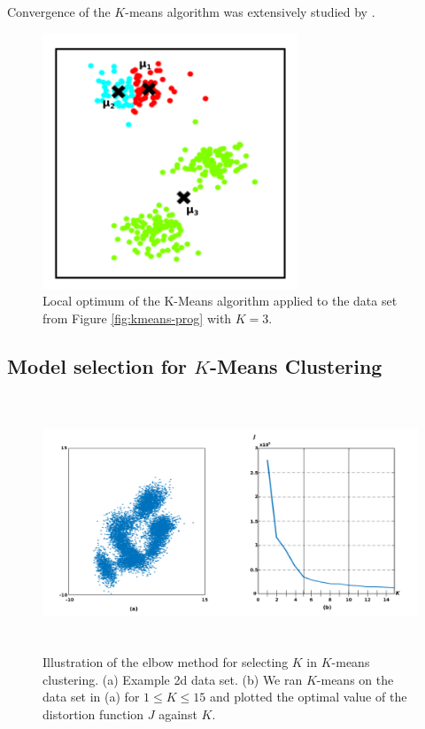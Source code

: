 \documentclass[final,3p,times,twocolumn]{elsarticle}
\begin{document}
Convergence of the $K$-means algorithm was extensively studied by \cite{macqueen1967}.

\begin{figure}
\centering
\includegraphics[width=3in]{local.png}
\caption{Local optimum of the K-Means algorithm applied to the data set from Figure \ref{fig:kmeans-prog} with $K=3$.}
\label{fig:kmeans-local}
\end{figure}



\subsection{Model selection for $K$-Means Clustering}
\label{sect:kmeans-ms}

\begin{figure}
\centering
\includegraphics[width=\textwidth,height=3in]{elbow.png}
\caption{Illustration of the elbow method for selecting $K$ in $K$-means clustering. 
(a) Example 2d data set.
(b) We ran $K$-means on the data set in (a) for $1\leq K\leq 15$ and plotted the optimal value of the distortion function $J$ against $K$.}
\label{fig:kmeans-elbow}
\end{figure}
\end{document}
